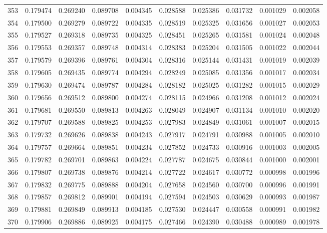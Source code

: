 \begin{tabular}{lrrrrrrrrr}
353 & 0.179474 & 0.269240 & 0.089708 & 0.004345 & 0.028588 & 0.025386 & 0.031732 & 0.001029 & 0.002058 \\
354 & 0.179500 & 0.269279 & 0.089722 & 0.004335 & 0.028519 & 0.025325 & 0.031656 & 0.001027 & 0.002053 \\
355 & 0.179527 & 0.269318 & 0.089735 & 0.004325 & 0.028451 & 0.025265 & 0.031581 & 0.001024 & 0.002048 \\
356 & 0.179553 & 0.269357 & 0.089748 & 0.004314 & 0.028383 & 0.025204 & 0.031505 & 0.001022 & 0.002044 \\
357 & 0.179579 & 0.269396 & 0.089761 & 0.004304 & 0.028316 & 0.025144 & 0.031431 & 0.001019 & 0.002039 \\
358 & 0.179605 & 0.269435 & 0.089774 & 0.004294 & 0.028249 & 0.025085 & 0.031356 & 0.001017 & 0.002034 \\
359 & 0.179630 & 0.269474 & 0.089787 & 0.004284 & 0.028182 & 0.025025 & 0.031282 & 0.001015 & 0.002029 \\
360 & 0.179656 & 0.269512 & 0.089800 & 0.004274 & 0.028115 & 0.024966 & 0.031208 & 0.001012 & 0.002024 \\
361 & 0.179681 & 0.269550 & 0.089813 & 0.004263 & 0.028049 & 0.024907 & 0.031134 & 0.001010 & 0.002020 \\
362 & 0.179707 & 0.269588 & 0.089825 & 0.004253 & 0.027983 & 0.024849 & 0.031061 & 0.001007 & 0.002015 \\
363 & 0.179732 & 0.269626 & 0.089838 & 0.004243 & 0.027917 & 0.024791 & 0.030988 & 0.001005 & 0.002010 \\
364 & 0.179757 & 0.269664 & 0.089851 & 0.004234 & 0.027852 & 0.024733 & 0.030916 & 0.001003 & 0.002005 \\
365 & 0.179782 & 0.269701 & 0.089863 & 0.004224 & 0.027787 & 0.024675 & 0.030844 & 0.001000 & 0.002001 \\
366 & 0.179807 & 0.269738 & 0.089876 & 0.004214 & 0.027722 & 0.024617 & 0.030772 & 0.000998 & 0.001996 \\
367 & 0.179832 & 0.269775 & 0.089888 & 0.004204 & 0.027658 & 0.024560 & 0.030700 & 0.000996 & 0.001991 \\
368 & 0.179857 & 0.269812 & 0.089901 & 0.004194 & 0.027594 & 0.024503 & 0.030629 & 0.000993 & 0.001987 \\
369 & 0.179881 & 0.269849 & 0.089913 & 0.004185 & 0.027530 & 0.024447 & 0.030558 & 0.000991 & 0.001982 \\
370 & 0.179906 & 0.269886 & 0.089925 & 0.004175 & 0.027466 & 0.024390 & 0.030488 & 0.000989 & 0.001978 \\

\end{tabular}
